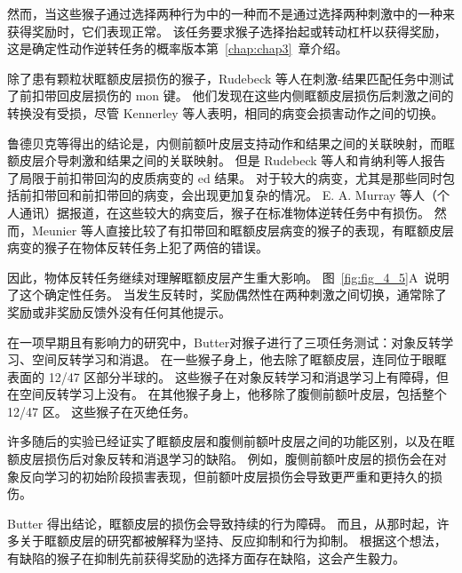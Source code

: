 然而，当这些猴子通过选择两种行为中的一种而不是通过选择两种刺激中的一种来获得奖励时，它们表现正常。
该任务要求猴子选择抬起或转动杠杆以获得奖励，这是确定性动作逆转任务的概率版本第~\ref{chap:chap3}~章介绍。\par


除了患有颗粒状眶额皮层损伤的猴子，Rudebeck 等人在刺激-结果匹配任务中测试了前扣带回皮层损伤的 mon 键。
他们发现在这些内侧眶额皮层损伤后刺激之间的转换没有受损，尽管 Kennerley 等人\cite{kennerley2006optimal}表明，相同的病变会损害动作之间的切换。\par



鲁德贝克等得出的结论是，内侧前额叶皮层支持动作和结果之间的关联映射，而眶额皮层介导刺激和结果之间的关联映射。
但是 Rudebeck 等人和肯纳利等人报告了局限于前扣带回沟的皮质病变的 ed 结果。
对于较大的病变，尤其是那些同时包括前扣带回和前扣带回的病变，会出现更加复杂的情况。
E. A. Murray 等人（个人通讯）据报道，在这些较大的病变后，猴子在标准物体逆转任务中有损伤。
然而，Meunier 等人\cite{meunier1997effects}直接比较了有扣带回和眶额皮层病变的猴子的表现，有眶额皮层病变的猴子在物体反转任务上犯了两倍的错误。  \par


因此，物体反转任务继续对理解眶额皮层产生重大影响。
图~\ref{fig:fig_4_5}A~说明了这个确定性任务。
当发生反转时，奖励偶然性在两种刺激之间切换，通常除了奖励或非奖励反馈外没有任何其他提示。\par


在一项早期且有影响力的研究中，Butter\cite{butters1969retention}对猴子进行了三项任务测试：对象反转学习、空间反转学习和消退。
在一些猴子身上，他去除了眶额皮层，连同位于眼眶表面的 12/47 区部分半球的。
这些猴子在对象反转学习和消退学习上有障碍，但在空间反转学习上没有。
在其他猴子身上，他移除了腹侧前额叶皮层，包括整个 12/47 区。
这些猴子在灭绝任务。\par


许多随后的实验已经证实了眶额皮层和腹侧前额叶皮层之间的功能区别，以及在眶额皮层损伤后对象反转和消退学习的缺陷\cite{dias1997dissociable,izquierdo2004bilateral}。
例如，腹侧前额叶皮层的损伤会在对象反向学习的初始阶段损害表现，但前额叶皮层损伤会导致更严重和更持久的损伤\cite{rygula2010differential}。\par


Butter 得出结论，眶额皮层的损伤会导致持续的行为障碍。
而且，从那时起，许多关于眶额皮层的研究都被解释为坚持、反应抑制和行为抑制\cite{roberts2000inhibitory}。
根据这个想法，有缺陷的猴子在抑制先前获得奖励的选择方面存在缺陷，这会产生毅力。\par


